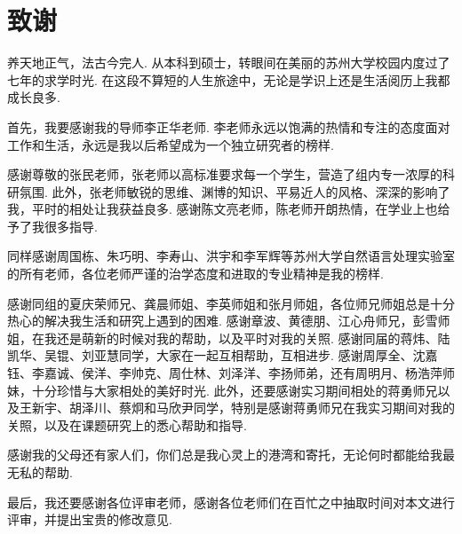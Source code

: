 \chapter{致谢}

养天地正气，法古今完人.
从本科到硕士，转眼间在美丽的苏州大学校园内度过了七年的求学时光.
在这段不算短的人生旅途中，无论是学识上还是生活阅历上我都成长良多.

首先，我要感谢我的导师李正华老师.
李老师永远以饱满的热情和专注的态度面对工作和生活，永远是我以后希望成为一个独立研究者的榜样.

感谢尊敬的张民老师，张老师以高标准要求每一个学生，营造了组内专一浓厚的科研氛围.
此外，张老师敏锐的思维、渊博的知识、平易近人的风格、深深的影响了我，平时的相处让我获益良多.
感谢陈文亮老师，陈老师开朗热情，在学业上也给予了我很多指导.

同样感谢周国栋、朱巧明、李寿山、洪宇和李军辉等苏州大学自然语言处理实验室的所有老师，各位老师严谨的治学态度和进取的专业精神是我的榜样.

感谢同组的夏庆荣师兄、龚晨师姐、李英师姐和张月师姐，各位师兄师姐总是十分热心的解决我生活和研究上遇到的困难.
感谢章波、黄德朋、江心舟师兄，彭雪师姐，在我还是萌新的时候对我的帮助，以及平时对我的关照.
感谢同届的蒋炜、陆凯华、吴锟、刘亚慧同学，大家在一起互相帮助，互相进步.
感谢周厚全、沈嘉钰、李嘉诚、侯洋、李帅克、周仕林、刘泽洋、李扬师弟，还有周明月、杨浩萍师妹，十分珍惜与大家相处的美好时光.
此外，还要感谢实习期间相处的蒋勇师兄以及王新宇、胡泽川、蔡炯和马欣尹同学，特别是感谢蒋勇师兄在我实习期间对我的关照，以及在课题研究上的悉心帮助和指导.

感谢我的父母还有家人们，你们总是我心灵上的港湾和寄托，无论何时都能给我最无私的帮助.

最后，我还要感谢各位评审老师，感谢各位老师们在百忙之中抽取时间对本文进行评审，并提出宝贵的修改意见.

